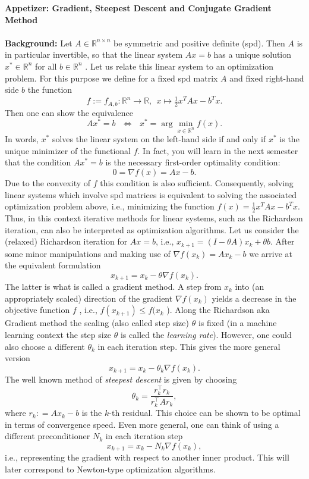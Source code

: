 \textbf{Appetizer: Gradient, Steepest Descent and Conjugate Gradient Method}\\~\\
{\color{navy} \textbf{Background:}
	Let $A \in \mathbb{R}^{n \times n}$ be symmetric and positive definite (spd). Then $A$ is in particular invertible, so that the
	linear system
	$Ax = b$
	has a unique solution $x^* \in \mathbb{R}^{n}$  for all $b \in \mathbb{R}^{n}$  . Let us relate this linear system to an optimization problem.
	For this purpose we define for a fixed spd matrix $A$ and fixed right-hand side $b$ the function
	$$f:=f_{A,b} : \mathbb{R}^{n}  \to \mathbb{R}, ~~x  \mapsto \tfrac{1}{2} x^T Ax - b^T x.$$
	Then one can show the equivalence
	$$Ax^* = b ~~~\iff~~~	x^* = \arg \min_{x\in\mathbb{R}^{n}} f (x).	$$
	In words, $x^*$ solves the linear system on the left-hand side if and only if $x^*$ is the unique minimizer of the
	functional $f$. In fact, you will learn in the next semester that the condition $Ax^* = b$ is the necessary first-order optimality
	condition:
	$$0 = \nabla f (x) = Ax - b.$$
	Due to the convexity of $f$ this condition is also sufficient.
	Consequently, solving linear systems which involve spd matrices is equivalent to solving the associated
	optimization problem above, i.e., minimizing the function $f (x) = \tfrac{1}{2} x^T Ax - b^T x$. Thus, in this context iterative methods
	for linear systems, such as the Richardson iteration, can also be interpreted as optimization algorithms.
	Let us consider the (relaxed) Richardson iteration for $Ax = b$, i.e.,
	$x_{k+1} = (I - \theta A)x_{k} + \theta b$.
	After some minor manipulations and making use of $\nabla f (x_{k} ) = Ax_{k} - b$ we arrive at the equivalent
	formulation
    $$x_{k+1} = x_{k} - \theta\nabla f (x_{k} ).$$
	The latter is what is called a gradient method. A step from $x_{k}$ into (an appropriately scaled) direction of the gradient
	$\nabla f (x_{k} )$ yields a decrease in the objective function $f$ , i.e., $f (x_{k+1} ) \leq  f (x_{k}$ ). Along the Richardson aka Gradient method the scaling (also called step size) $\theta$ is fixed (in a machine learning context the step size $\theta$ is called the \textit{learning rate}). However, one could also choose a different
	$\theta_k$  in each iteration step. This gives the more general version
\begin{equation}\label{steepest_descent_method}
	x_{k+1} = x_{k} - \theta_k  \nabla f (x_{k} ).
\end{equation}
	The well known method of \textit{steepest descent} is given by choosing
\begin{equation} \label{steepest_descent_stepsize}
	\theta_k  = \frac{r_k^\top r_k}{ r_k^\top   Ar_k  },
\end{equation}
where $r_k : = Ax_{k} - b$ is the $k$-th residual. This choice can be shown to be optimal in terms of convergence
	speed. Even more general, one can think of using a different preconditioner $N_k$ in each iteration step
	$$x_{k+1} = x_{k} - N_k \nabla f (x_{k} ),$$ 
	i.e., representing the gradient with respect to another inner product. This will later correspond to Newton-type optimization algorithms.
}
